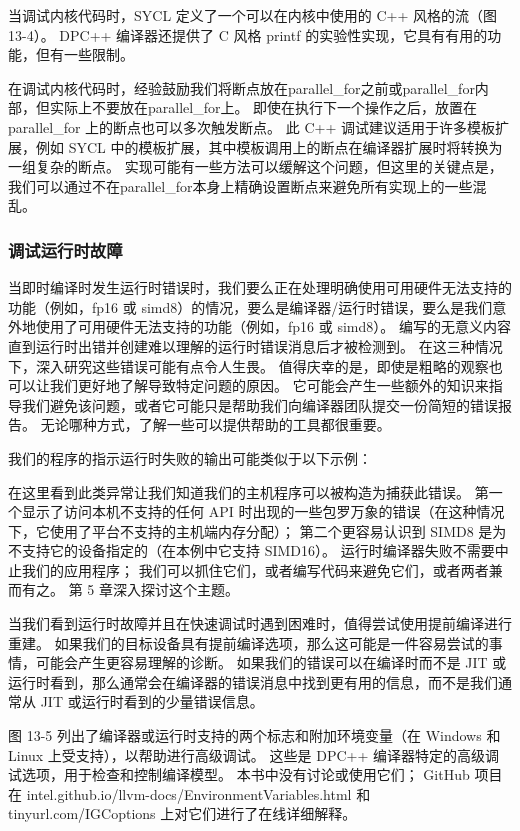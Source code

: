 当调试内核代码时，SYCL 定义了一个可以在内核中使用的 C++ 风格的流（图 13-4）。 DPC++ 编译器还提供了 C 风格 printf 的实验性实现，它具有有用的功能，但有一些限制。

在调试内核代码时，经验鼓励我们将断点放在parallel\_for之前或parallel\_for内部，但实际上不要放在parallel\_for上。 即使在执行下一个操作之后，放置在parallel\_for 上的断点也可以多次触发断点。 此 C++ 调试建议适用于许多模板扩展，例如 SYCL 中的模板扩展，其中模板调用上的断点在编译器扩展时将转换为一组复杂的断点。 实现可能有一些方法可以缓解这个问题，但这里的关键点是，我们可以通过不在parallel\_for本身上精确设置断点来避免所有实现上的一些混乱。

\subsubsection{调试运行时故障}
当即时编译时发生运行时错误时，我们要么正在处理明确使用可用硬件无法支持的功能（例如，fp16 或 simd8）的情况，要么是编译器/运行时错误，要么是我们意外地使用了可用硬件无法支持的功能（例如，fp16 或 simd8）。 编写的无意义内容直到运行时出错并创建难以理解的运行时错误消息后才被检测到。 在这三种情况下，深入研究这些错误可能有点令人生畏。 值得庆幸的是，即使是粗略的观察也可以让我们更好地了解导致特定问题的原因。 它可能会产生一些额外的知识来指导我们避免该问题，或者它可能只是帮助我们向编译器团队提交一份简短的错误报告。 无论哪种方式，了解一些可以提供帮助的工具都很重要。

我们的程序的指示运行时失败的输出可能类似于以下示例：

在这里看到此类异常让我们知道我们的主机程序可以被构造为捕获此错误。 第一个显示了访问本机不支持的任何 API 时出现的一些包罗万象的错误（在这种情况下，它使用了平台不支持的主机端内存分配）； 第二个更容易认识到 SIMD8 是为不支持它的设备指定的（在本例中它支持 SIMD16）。 运行时编译器失败不需要中止我们的应用程序； 我们可以抓住它们，或者编写代码来避免它们，或者两者兼而有之。 第 5 章深入探讨这个主题。

当我们看到运行时故障并且在快速调试时遇到困难时，值得尝试使用提前编译进行重建。 如果我们的目标设备具有提前编译选项，那么这可能是一件容易尝试的事情，可能会产生更容易理解的诊断。 如果我们的错误可以在编译时而不是 JIT 或运行时看到，那么通常会在编译器的错误消息中找到更有用的信息，而不是我们通常从 JIT 或运行时看到的少量错误信息。

图 13-5 列出了编译器或运行时支持的两个标志和附加环境变量（在 Windows 和 Linux 上受支持），以帮助进行高级调试。 这些是 DPC++ 编译器特定的高级调试选项，用于检查和控制编译模型。 本书中没有讨论或使用它们； GitHub 项目在 intel.github.io/llvm-docs/EnvironmentVariables.html 和tinyurl.com/IGCoptions 上对它们进行了在线详细解释。

